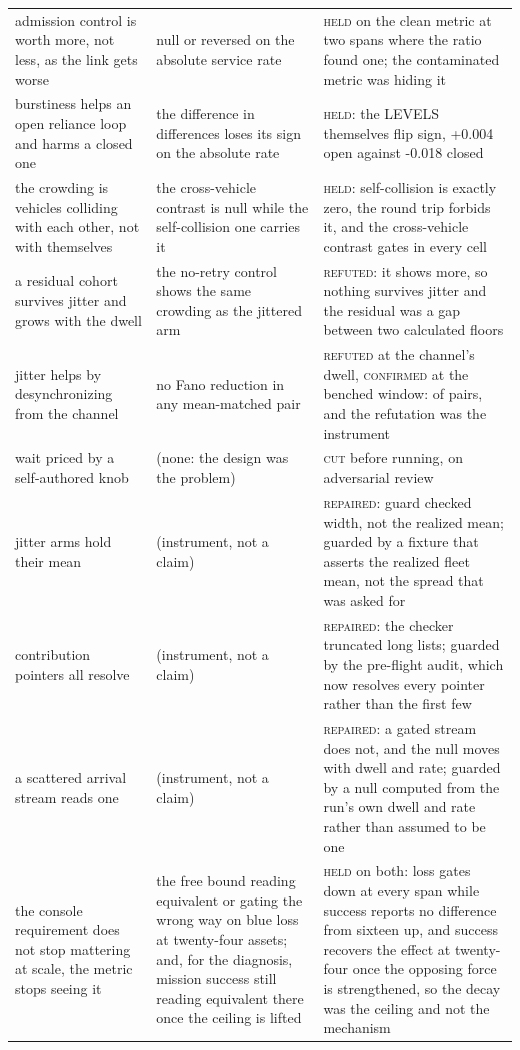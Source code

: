 \begin{tabular}{@{}p{}p{}p{}@{}}
admission control is worth more, not less, as the link gets worse & null or reversed on the absolute service rate & \textsc{held} on the clean metric at two spans where the ratio found one; the contaminated metric was hiding it \\
burstiness helps an open reliance loop and harms a closed one & the difference in differences loses its sign on the absolute rate & \textsc{held}: the LEVELS themselves flip sign, +0.004 open against -0.018 closed \\
the crowding is vehicles colliding with each other, not with themselves & the cross-vehicle contrast is null while the self-collision one carries it & \textsc{held}: self-collision is exactly zero, the round trip forbids it, and the cross-vehicle contrast gates in every cell \\
a residual cohort survives jitter and grows with the dwell & the no-retry control shows the same crowding as the jittered arm & \textsc{refuted}: it shows more, so nothing survives jitter and the residual was a gap between two calculated floors \\
jitter helps by desynchronizing from the channel & no Fano reduction in any mean-matched pair & \textsc{refuted} at the channel's dwell, \textsc{confirmed} at the benched window: \frGeRed{} of \frGePairs{} pairs, and the refutation was the instrument \\
wait priced by a self-authored knob & (none: the design was the problem) & \textsc{cut} before running, on adversarial review \\
jitter arms hold their mean & (instrument, not a claim) & \textsc{repaired}: guard checked width, not the realized mean; guarded by a fixture that asserts the realized fleet mean, not the spread that was asked for \\
contribution pointers all resolve & (instrument, not a claim) & \textsc{repaired}: the checker truncated long lists; guarded by the pre-flight audit, which now resolves every pointer rather than the first few \\
a scattered arrival stream reads one & (instrument, not a claim) & \textsc{repaired}: a gated stream does not, and the null moves with dwell and rate; guarded by a null computed from the run's own dwell and rate rather than assumed to be one \\
the console requirement does not stop mattering at scale, the metric stops seeing it & the free bound reading equivalent or gating the wrong way on blue loss at twenty-four assets; and, for the diagnosis, mission success still reading equivalent there once the ceiling is lifted & \textsc{held} on both: loss gates down at every span while success reports no difference from sixteen up, and success recovers the effect at twenty-four once the opposing force is strengthened, so the decay was the ceiling and not the mechanism \\

\end{tabular}
